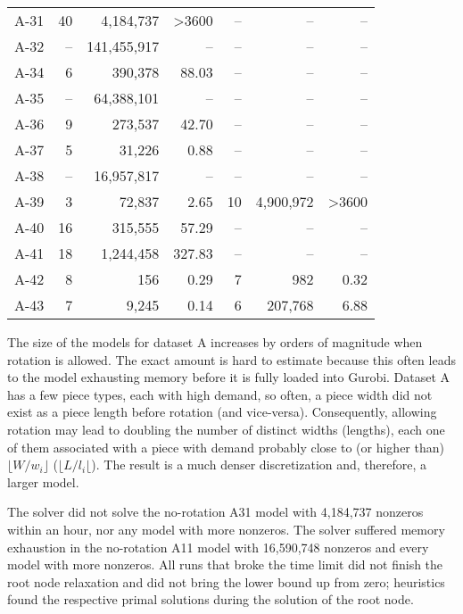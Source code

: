 \begin{table}[!htpb]
\begin{tabular}{lrrrrrr}
A-31 & 40 & 4,184,737 & >3600 & -- & -- & -- \\
A-32 & -- & 141,455,917 & -- & -- & -- & -- \\
A-34 & 6 & 390,378 & 88.03 & -- & -- & -- \\
A-35 & -- & 64,388,101 & -- & -- & -- & -- \\
A-36 & 9 & 273,537 & 42.70 & -- & -- & -- \\
A-37 & 5 & 31,226 & 0.88 & -- & -- & -- \\
A-38 & -- & 16,957,817 & -- & -- & -- & -- \\
A-39 & 3 & 72,837 & 2.65 & 10 & 4,900,972 & >3600 \\
A-40 & 16 & 315,555 & 57.29 & -- & -- & -- \\
A-41 & 18 & 1,244,458 & 327.83 & -- & -- & -- \\
A-42 & 8 & 156 & 0.29 & 7 & 982 & 0.32 \\
A-43 & 7 & 9,245 & 0.14 & 6 & 207,768 & 6.88 \\\hline\hline
\end{tabular}%
\end{table}

The size of the models for dataset A increases by orders of magnitude when rotation is allowed.
The exact amount is hard to estimate because this often leads to the model exhausting memory before it is fully loaded into Gurobi.
Dataset A has a few piece types, each with high demand, so often, a piece width did not exist as a piece length before rotation (and vice-versa).
Consequently, allowing rotation may lead to doubling the number of distinct widths (lengths), each one of them associated with a piece with demand probably close to (or higher than) \(\lfloor W/w_i \rfloor\) (\(\lfloor L/l_i \lfloor\)).
The result is a much denser discretization and, therefore, a larger model.

The solver did not solve the no-rotation A31 model with 4,184,737 nonzeros within an hour, nor any model with more nonzeros.
The solver suffered memory exhaustion in the no-rotation A11 model with 16,590,748 nonzeros and every model with more nonzeros.
All runs that broke the time limit did not finish the root node relaxation and did not bring the lower bound up from zero; heuristics found the respective primal solutions during the solution of the root node.


